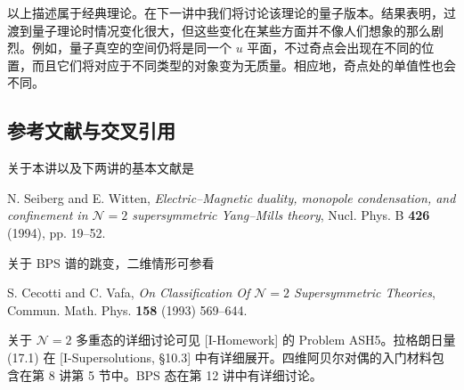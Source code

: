 
以上描述属于经典理论。在下一讲中我们将讨论该理论的量子版本。结果表明，过渡到量子理论时情况变化很大，但这些变化在某些方面并不像人们想象的那么剧烈。例如，量子真空的空间仍将是同一个 $u$ 平面，不过奇点会出现在不同的位置，而且它们将对应于不同类型的对象变为无质量。相应地，奇点处的单值性也会不同。

\subsection{参考文献与交叉引用}

关于本讲以及下两讲的基本文献是

N. Seiberg and E. Witten, \emph{Electric--Magnetic duality, monopole condensation,
and confinement in $\mathcal{N}=2$ supersymmetric Yang--Mills theory},
Nucl. Phys. B \textbf{426} (1994), pp. 19--52.

关于 BPS 谱的跳变，二维情形可参看

S. Cecotti and C. Vafa, \emph{On Classification Of $\mathcal{N}=2$ Supersymmetric
Theories}, Commun. Math. Phys. \textbf{158} (1993) 569--644.

关于 $\mathcal{N}=2$ 多重态的详细讨论可见 [I-Homework] 的 Problem ASH5。拉格朗日量 (17.1) 在 [I-Supersolutions, §10.3] 中有详细展开。四维阿贝尔对偶的入门材料包含在第 8 讲第 5 节中。BPS 态在第 12 讲中有详细讨论。


